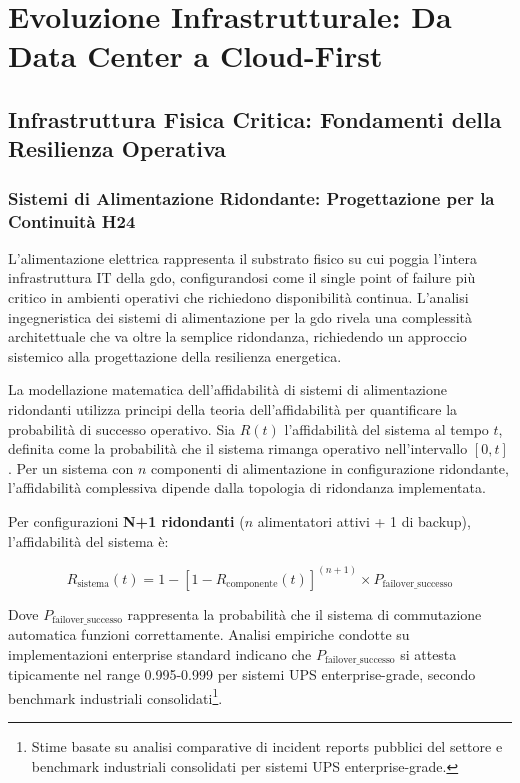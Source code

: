 \chapter{Evoluzione Infrastrutturale: Da Data Center a Cloud-First}
\label{ch:evoluzione-infrastrutturale}

\section{Infrastruttura Fisica Critica: Fondamenti della Resilienza Operativa}
\label{sec:infrastruttura-fisica}

\subsection{Sistemi di Alimentazione Ridondante: Progettazione per la Continuità H24}
\label{subsec:alimentazione-ridondante}

L'alimentazione elettrica rappresenta il substrato fisico su cui poggia l'intera infrastruttura IT della \gls{gdo}, configurandosi come il single point of failure più critico in ambienti operativi che richiedono disponibilità continua. L'analisi ingegneristica dei sistemi di alimentazione per la \gls{gdo} rivela una complessità architettuale che va oltre la semplice ridondanza, richiedendo un approccio sistemico alla progettazione della resilienza energetica.

La modellazione matematica dell'affidabilità di sistemi di alimentazione ridondanti utilizza principi della teoria dell'affidabilità per quantificare la probabilità di successo operativo. Sia $R(t)$ l'affidabilità del sistema al tempo $t$, definita come la probabilità che il sistema rimanga operativo nell'intervallo $[0,t]$. Per un sistema con $n$ componenti di alimentazione in configurazione ridondante, l'affidabilità complessiva dipende dalla topologia di ridondanza implementata.

Per configurazioni \textbf{N+1 ridondanti} ($n$ alimentatori attivi + 1 di backup), l'affidabilità del sistema è:

\begin{equation}
R_{\text{sistema}}(t) = 1 - [1 - R_{\text{componente}}(t)]^{(n+1)} \times P_{\text{failover\_successo}}
\label{eq:affidabilita-n-plus-1}
\end{equation}

Dove $P_{\text{failover\_successo}}$ rappresenta la probabilità che il sistema di commutazione automatica funzioni correttamente. Analisi empiriche condotte su implementazioni enterprise standard indicano che $P_{\text{failover\_successo}}$ si attesta tipicamente nel range 0.995-0.999 per sistemi UPS enterprise-grade, secondo benchmark industriali consolidati\footnote{Stime basate su analisi comparative di incident reports pubblici del settore e benchmark industriali consolidati per sistemi UPS enterprise-grade.}.

